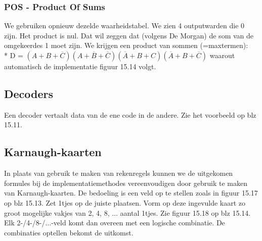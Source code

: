 \documentclass[10pt]{article}
\begin{document}
\subsubsection{POS - Product Of Sums}
We gebruiken opnieuw dezelde waarheidstabel. We zien 4 outputwarden die 0 zijn. Het product is nul. Dat wil zeggen dat (volgens De Morgan) de som van de omgekeerdes 1 moet zijn. We krijgen een product van sommen (=maxtermen):\\*
D = $(A+B+\overline{C})(A+\overline{B}+\overline{C})(\overline{A}+B+C)(\overline{A}+B+\overline{C})$ waarout automatisch de implementatie figuur 15.14 volgt.
\subsection{Decoders}
Een decoder vertaalt data van de ene code in de andere. Zie het voorbeeld op blz 15.11.
\subsection{Karnaugh-kaarten}
In plaats van gebruik te maken van rekenregels kunnen we de uitgekomen formules bij de implementatiemethodes vereenvoudigen door gebruik te maken van Karnaugh-kaarten. De bedoeling is een veld op te stellen zoals in figuur 15.17 op blz 15.13. Zet 1tjes op de juiste plaatsen. Vorm op deze ingevulde kaart zo groot mogelijke vakjes van 2, 4, 8, $\dots$ aantal 1tjes. Zie figuur 15.18 op blz 15.14. Elk 2-/4-/8-/$\dots$-veld komt dan overeen met een logische combinatie. De combinaties optellen bekomt de uitkomst.
\end{document}
